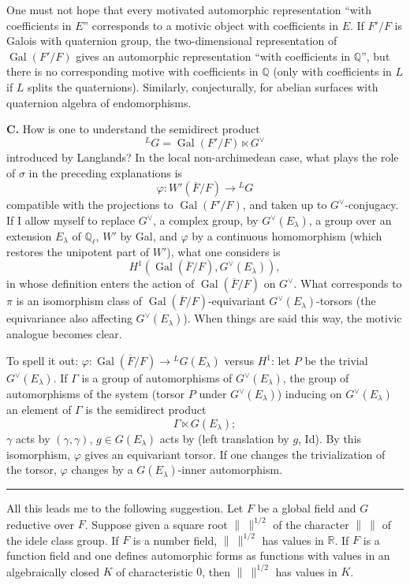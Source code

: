 \documentclass[11pt]{article}
\newcommand{\Gal}{\operatorname{Gal}}
\newcommand{\Fbar}{\overline F}
\newcommand{\normchar}{\|\ \|}
\newcommand{\LG}{{}^{L}G}
\begin{document}
One must not hope that every motivated automorphic representation ``with coefficients in \(E\)'' corresponds to a motivic object with coefficients in \(E\). If \(F'/F\) is Galois with quaternion group, the two-dimensional representation of \(\Gal(F'/F)\) gives an automorphic representation ``with coefficients in \(\mathbb Q\)'', but there is no corresponding motive with coefficients in \(\mathbb Q\) (only with coefficients in \(L\) if \(L\) splits the quaternions). Similarly, conjecturally, for abelian surfaces with quaternion algebra of endomorphisms.

\textbf{C.} How is one to understand the semidirect product
\[
\LG=\Gal(F'/F)\ltimes G^\vee
\]
introduced by Langlands? In the local non-archimedean case, what plays the role of \(\sigma\) in the preceding explanations is
\[
\varphi:W'(\Fbar/F)\longrightarrow \LG
\]
compatible with the projections to \(\Gal(F'/F)\), and taken up to \(G^\vee\)-conjugacy. If I allow myself to replace \(G^\vee\), a complex group, by \(G^\vee(E_\lambda)\), a group over an extension \(E_\lambda\) of \(\mathbb Q_\ell\), \(W'\) by Gal, and \(\varphi\) by a continuous homomorphism (which restores the unipotent part of \(W'\)), what one considers is
\[
H^1(\Gal(\Fbar/F),G^\vee(E_\lambda)),
\]
in whose definition enters the action of \(\Gal(\Fbar/F)\) on \(G^\vee\). What corresponds to \(\pi\) is an isomorphism class of \(\Gal(\Fbar/F)\)-equivariant \(G^\vee(E_\lambda)\)-torsors (the equivariance also affecting \(G^\vee(E_\lambda)\)). When things are said this way, the motivic analogue becomes clear.

To spell it out: \(\varphi:\Gal(\Fbar/F)\to \LG(E_\lambda)\) versus \(H^1\): let \(P\) be the trivial \(G^\vee(E_\lambda)\). If \(\Gamma\) is a group of automorphisms of \(G^\vee(E_\lambda)\), the group of automorphisms of the system (torsor \(P\) under \(G^\vee(E_\lambda)\)) inducing on \(G^\vee(E_\lambda)\) an element of \(\Gamma\) is the semidirect product
\[
\Gamma\ltimes G(E_\lambda);
\]
\(\gamma\) acts by \((\gamma,\gamma)\), \(g\in G(E_\lambda)\) acts by (left translation by \(g\), Id). By this isomorphism, \(\varphi\) gives an equivariant torsor. If one changes the trivialization of the torsor, \(\varphi\) changes by a \(G(E_\lambda)\)-inner automorphism.

\bigskip
\begin{center}\rule{0.32\linewidth}{0.4pt}\end{center}
\bigskip

All this leads me to the following suggestion. Let \(F\) be a global field and \(G\) reductive over \(F\). Suppose given a square root \(\normchar^{1/2}\) of the character \(\normchar\) of the idele class group. If \(F\) is a number field, \(\normchar^{1/2}\) has values in \(\mathbb R\). If \(F\) is a function field and one defines automorphic forms as functions with values in an algebraically closed \(K\) of characteristic \(0\), then \(\normchar^{1/2}\) has values in \(K\).
\end{document}
